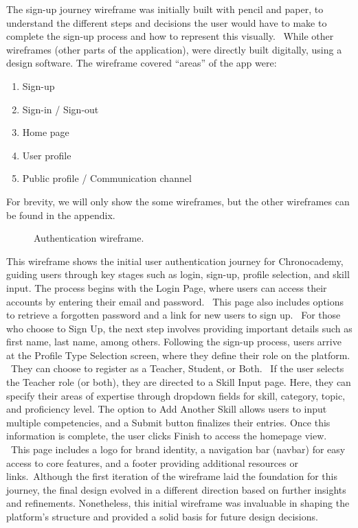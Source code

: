 The sign-up journey wireframe was initially built with pencil and paper, to understand the different steps and decisions the user would have to make to complete the sign-up process and how to represent this visually. \ While other wireframes (other parts of the application), were directly built digitally, using a design software.
The wireframe covered ``areas'' of the app were:
\begin{enumerate}
    \item Sign-up
    \item Sign-in / Sign-out
    \item Home page
    \item User profile
    \item Public profile / Communication channel
\end{enumerate}
For brevity, we will only show the some wireframes, but the other wireframes can be found in the appendix.\newline
\begin{figure}[h]
    \centering
    \caption{Authentication wireframe.}
    \label{fig:figure21}
\end{figure}

This wireframe shows the initial user authentication journey for Chronocademy, guiding users through key stages such as login, sign-up, profile selection, and skill input.
The process begins with the Login Page, where users can access their accounts by entering their email and password. \ This page also includes options to retrieve a forgotten password and a link for new users to sign up. \ For those who choose to Sign Up, the next step involves providing important details such as first name, last name, among others.
Following the sign-up process, users arrive at the Profile Type Selection screen, where they define their role on the platform. \ They can choose to register as a Teacher, Student, or Both. \ If the user selects the Teacher role (or both), they are directed to a Skill Input page.
Here, they can specify their areas of expertise through dropdown fields for skill, category, topic, and proficiency level.
The option to Add Another Skill allows users to input multiple competencies, and a Submit button finalizes their entries.
Once this information is complete, the user clicks Finish to access the homepage view. \ This page includes a logo for brand identity, a navigation bar (navbar) for easy access to core features, and a footer providing additional resources or links.\ Although the first iteration of the wireframe laid the foundation for this journey, the final design evolved in a different direction based on further insights and refinements.
Nonetheless, this initial wireframe was invaluable in shaping the platform's structure and provided a solid basis for future design decisions.

